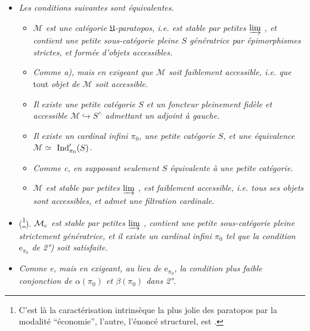 \begin{itemize}[leftmargin=2.5em]
\item[\textit{3°)}] \textit{Les conditions suivantes sont équivalentes.}
\begin{itemize}[leftmargin=3em]
\item[\textit{a)}] \textit{$\mathcal{M}$ est une catégorie $\mathfrak{U}$-paratopos, i.e. est stable par petites $\varinjlim$ , et contient une petite sous-catégorie pleine $S$ génératrice par épimorphismes strictes, et formée d'objets accessibles.} %
\item[\textit{a$'$)}] \textit{Comme a), mais en exigeant que $\mathcal{M}$ soit faiblement accessible, i.e. que} tout \textit{objet de $\mathcal{M}$ soit accessible.}
\item[\textit{b)}] \textit{Il existe une petite catégorie $S$ et un foncteur pleinement fidèle et accessible $\mathcal{M}\hookrightarrow S^{\wedge}$ admettant un adjoint à gauche.}
\item[\circled{c}] \textit{Il existe un cardinal infini $\pi_0$, une petite catégorie $S$, et une équivalence $\mathcal{M}\simeq$ $\operatorname{Ind}'_{\pi_0}(S)$.}
\item[\textit{c$'$)}] \textit{Comme c, en supposant seulement $S$ équivalente à une petite catégorie.}
\item[\textit{d)}] \textit{$\mathcal{M}$ est stable par petites $\varinjlim$ , est faiblement accessible, i.e. tous ses objets sont accessibles, et admet une filtration cardinale.}
\end{itemize}
\end{itemize}


\begin{itemize}[leftmargin=4em]
\item[\circled{e}] (\footnote[60]{C'est là la caractérisation intrinsèque la plus jolie des paratopos par la modalité “économie”, l'autre, l'énoncé structurel, est  .}). \textit{$\mathcal{M}_{\mathrm{c}}$ est stable par petites $\varinjlim$ , contient une petite sous-catégorie pleine strictement génératrice, et il existe un cardinal infini $\pi_0$ tel que la condition $\mathrm{e}_{\pi_0}$ de 2°) soit satisfaite.}
\item[\circled{e$'$}] \textit{Comme e, mais en exigeant, au lieu de $\mathrm{e}_{\pi_0}$, la condition plus faible conjonction de $\alpha(\pi_0)$ et $\beta(\pi_0)$ dans 2°.}
\end{itemize}

